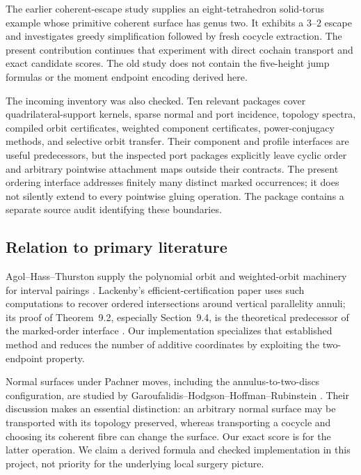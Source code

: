 \documentclass[11pt,letterpaper]{article}
\theoremstyle{definition}
\theoremstyle{remark}
\begin{document}
The earlier coherent-escape study supplies an eight-tetrahedron solid-torus
example whose primitive coherent surface has genus two. It exhibits a
$3$--$2$ escape and investigates greedy simplification followed by fresh
cocycle extraction. The present contribution continues that experiment
with direct cochain transport and exact candidate scores. The old study
does not contain the five-height jump formulas or the moment endpoint
encoding derived here.

The incoming inventory was also checked. Ten relevant packages cover
quadrilateral-support kernels, sparse normal and port incidence, topology
spectra, compiled orbit certificates, weighted component certificates,
power-conjugacy methods, and selective orbit transfer. Their component
and profile interfaces are useful predecessors, but the inspected port
packages explicitly leave cyclic order and arbitrary pointwise attachment
maps outside their contracts. The present ordering interface addresses
finitely many distinct marked occurrences; it does not silently extend to
every pointwise gluing operation. The package contains a separate source
audit identifying these boundaries.

\subsection{Relation to primary literature}

Agol--Hass--Thurston supply the polynomial orbit and weighted-orbit
machinery for interval pairings \cite{AHT}. Lackenby's efficient-certification
paper uses such computations to recover ordered intersections around
vertical parallelity annuli; its proof of Theorem~9.2, especially
Section~9.4, is the theoretical predecessor of the marked-order interface
\cite{LackenbyCertification}. Our implementation specializes that established
method and reduces the number of additive coordinates by exploiting the
two-endpoint property.

Normal surfaces under Pachner moves, including the annulus-to-two-discs
configuration, are studied by Garoufalidis--Hodgson--Hoffman--Rubinstein
\cite[Section~12.4]{GHHR}. Their discussion makes an essential distinction:
an arbitrary normal surface may be transported with its topology preserved,
whereas transporting a cocycle and choosing its coherent fibre can change
the surface. Our exact score is for the latter operation. We claim a
derived formula and checked implementation in this project, not priority
for the underlying local surgery picture.
\end{document}
